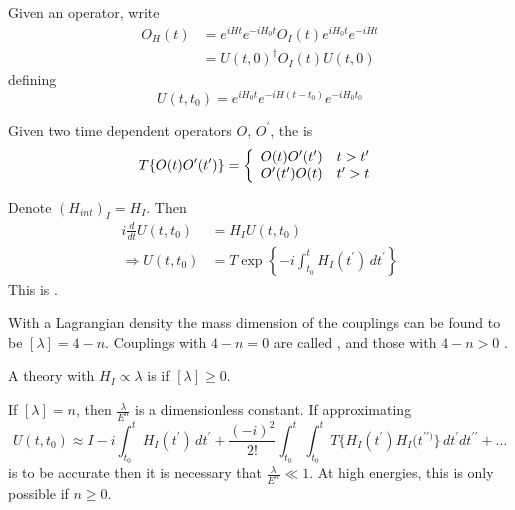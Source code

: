 \documentclass{article}
\begin{document}
\begin{definition}[$U(t,t_0)$]
Given an operator, write 
\begin{align*}
O_H(t) &= e^{iHt} e^{-iH_0t} O_I(t) e^{iH_0t}e^{-iHt} \\
 &= U(t,0)^\dagger O_I(t) U(t,0)
\end{align*}
defining 
\[
U(t,t_0) = e^{iH_0 t}e^{-iH (t-t_0)} e^{-iH_0 t_0}
\]
\end{definition}

\begin{definition}
Given two time dependent operators $O$, $O^\prime$, the  is 
\[
T \{ O(t) O^\prime(t^\prime) \} = \left\{ \begin{array}{lc} O(t) O^\prime(t^\prime) & t > t^\prime \\
    O^\prime(t^\prime) O(t) & t^\prime > t 
    \end{array} \right. \\
\]
\end{definition}

\begin{theorem}
Denote $(H_{int})_I = H_I$. Then 
\begin{align*}
i \frac{d}{dt} U(t,t_0) &= H_I U(t,t_0) \\
\Rightarrow U(t,t_0) &= T \exp\left\{ -i \int_{t_0}^t H_I(t^\prime) \, dt^\prime \right\}
\end{align*}
This is . 
\end{theorem}

\begin{definition}
With a Lagrangian density 
the mass dimension of the couplings can be found to be $[\lambda] = 4-n$. Couplings with $4-n = 0$ are called , and those with $4-n > 0$ . 
\end{definition}

\begin{definition}[Renormalizable]
A theory with $H_I \propto \lambda$ is  if $[\lambda]\geq0$. 
\end{definition}

\begin{idea}
If $[\lambda]=n$, then $\frac{\lambda}{E^n}$ is a dimensionless constant. If approximating 
\[
U(t,t_0) \approx I -i\int_{t_0}^t H_I(t^\prime) \, dt^\prime + \frac{(-i)^2}{2!}\int_{t_0}^t \int_{t_0}^t T\{ H_I(t^\prime) H_I(t^{\prime\prime)} \} \, dt^\prime dt^{\prime\prime} + \dots
\]
is to be accurate then it is necessary that $\frac{\lambda}{E^n} \ll 1$. At high energies, this is only possible if $n\geq0$.
\end{idea}
\end{document}
